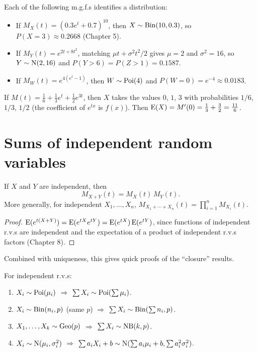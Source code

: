 \begin{example}[Recognising an m.g.f.]
Each of the following m.g.f.s identifies a distribution:
\begin{itemize}
  \item If $M_X(t) = (0.3e^t + 0.7)^{10}$, then $X\sim\operatorname{Bin}(10, 0.3)$, so
        $P(X = 3) \approx 0.2668$ (Chapter 5).
  \item If $M_Y(t) = e^{2t + 8t^2}$, matching $\mu t + \sigma^2t^2/2$ gives $\mu = 2$ and
        $\sigma^2 = 16$, so $Y\sim\operatorname{N}(2, 16)$ and $P(Y > 6) = P(Z > 1) = 0.1587$.
  \item If $M_W(t) = e^{4(e^t - 1)}$, then $W\sim\operatorname{Poi}(4)$ and
        $P(W = 0) = e^{-4}\approx 0.0183$.
\end{itemize}
\end{example}

\begin{example}
If $M(t) = \frac{1}{6} + \frac{1}{3}e^{t} + \frac{1}{2}e^{3t}$, then $X$ takes the values
$0$, $1$, $3$ with probabilities $1/6$, $1/3$, $1/2$ (the coefficient of $e^{tx}$ is
$f(x)$). Then $\operatorname{E}(X) = M'(0) = \frac13 + \frac32 = \frac{11}{6}$.
\end{example}

\section{Sums of independent random variables}

\begin{theorem}
If $X$ and $Y$ are independent, then
\[
  M_{X+Y}(t) = M_X(t)\,M_Y(t).
\]
More generally, for independent $X_1,\dots,X_n$,
$M_{X_1+\cdots+X_n}(t) = \prod_{i=1}^n M_{X_i}(t)$.
\end{theorem}

\begin{proof}
$\operatorname{E}(e^{t(X+Y)}) = \operatorname{E}(e^{tX}e^{tY}) = \operatorname{E}(e^{tX})\operatorname{E}(e^{tY})$, since functions of
independent r.v.s are independent and the expectation of a product of independent r.v.s
factors (Chapter 8).
\end{proof}

Combined with uniqueness, this gives quick proofs of the ``closure'' results.

\begin{theorem}
For independent r.v.s:
\begin{enumerate}
  \item $X_i\sim\operatorname{Poi}(\mu_i)$ $\Rightarrow$ $\sum X_i\sim\operatorname{Poi}(\sum\mu_i)$.
  \item $X_i\sim\operatorname{Bin}(n_i, p)$ (same $p$) $\Rightarrow$ $\sum X_i\sim\operatorname{Bin}(\sum n_i, p)$.
  \item $X_1,\dots,X_k\sim\operatorname{Geo}(p)$ $\Rightarrow$ $\sum X_i\sim\operatorname{NB}(k,p)$.
  \item $X_i\sim\operatorname{N}(\mu_i,\sigma_i^2)$ $\Rightarrow$ $\sum a_iX_i + b \sim
        \operatorname{N}(\sum a_i\mu_i + b, \sum a_i^2\sigma_i^2)$.
\end{enumerate}
\end{theorem}


